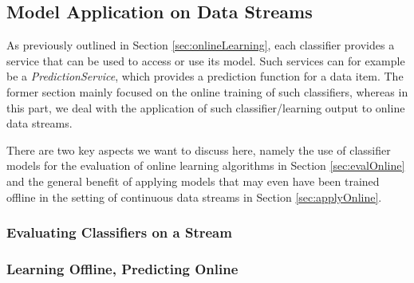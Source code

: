 \subsection{\label{sec:onlineApplication}Model Application on Data Streams}

As previously outlined in Section \ref{sec:onlineLearning}, each
classifier provides a service that can be used to access or use its
model. Such services can for example be a {\em PredictionService},
which provides a prediction function for a data item. The former
section mainly focused on the online training of such classifiers,
whereas in this part, we deal with the application of such
classifier/learning output to online data streams.

There are two key aspects we want to discuss here, namely the use of
classifier models for the evaluation of online learning algorithms in
Section \ref{sec:evalOnline} and the general benefit of applying
models that may even have been trained offline in the setting of
continuous data streams in Section \ref{sec:applyOnline}.



\subsubsection{\label{sec:evalOnline}Evaluating Classifiers on a Stream}




\subsubsection{\label{sec:applyOnline}Learning Offline, Predicting Online}


